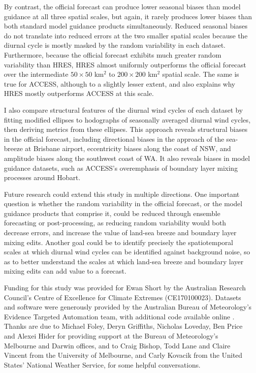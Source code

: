 \documentclass[twocol]{ametsoc}
\begin{document}
By contrast, the official forecast can produce lower seasonal biases than model guidance at all three spatial scales, but again, it rarely produces lower biases than both standard model guidance products simultaneously. Reduced seasonal biases do not translate into reduced errors at the two smaller spatial scales because the diurnal cycle is mostly masked by the random variability in each dataset. Furthermore, because the official forecast exhibits much greater random variability than HRES, HRES almost uniformly outperforms the official forecast over the intermediate $50\times 50$ km$^{2}$ to $200 \times 200$ km$^{2}$ spatial scale. The same is true for ACCESS, although to a slightly lesser extent, and also explains why HRES mostly outperforms ACCESS at this scale. 

I also compare structural features of the diurnal wind cycles of each dataset by fitting modified ellipses to hodographs of seasonally averaged diurnal wind cycles, then deriving metrics from these ellipses. This approach reveals structural biases in the official forecast, including directional biases in the approach of the sea-breeze at Brisbane airport, eccentricity biases along the coast of NSW, and amplitude biases along the southwest coast of WA. It also reveals biases in model guidance datasets, such as ACCESS's overemphasis of boundary layer mixing processes around Hobart.   

Future research could extend this study in multiple directions. One important question is whether the random variability in the official forecast, or the model guidance products that comprise it, could be reduced through ensemble forecasting or post-processing, as reducing random variability would both decrease errors, and increase the value of land-sea breeze and boundary layer mixing edits. Another goal could be to identify precisely the spatiotemporal scales at which diurnal wind cycles can be identified against background noise, so as to better understand the scales at which land-sea breeze and boundary layer mixing edits can add value to a forecast.  

\acknowledgments
Funding for this study was provided for Ewan Short by the Australian Research Council's Centre of Excellence for Climate Extremes (CE170100023). Datasets and software were generously provided by the Australian Bureau of Meteorology's Evidence Targeted Automation team, with additional code available online \citep{shortGitVeri19}. Thanks are due to Michael Foley, Deryn Griffiths, Nicholas Loveday, Ben Price and Alexei Hider for providing support at the Bureau of Meteorology's Melbourne and Darwin offices, and to Craig Bishop, Todd Lane and Claire Vincent from the University of Melbourne, and Carly Kovacik from the United States' National Weather Service, for some helpful conversations. 



\end{document}
